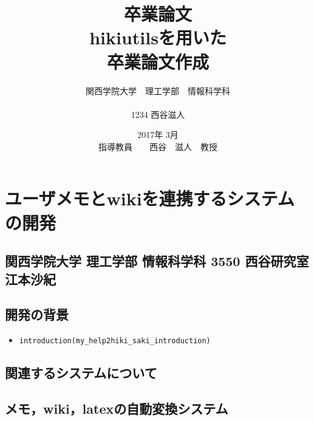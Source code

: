 \documentclass[12pt,a4paper]{jsarticle}
\begin{document}
\title{卒業論文\\
\vspace{4cm} hikiutilsを用いた\\卒業論文作成}
\author{ 関西学院大学　理工学部　情報科学科\\\\1234 西谷滋人}
\date{\vspace{3cm} 2017年  3月\\
\vspace{3cm} 指導教員　　西谷　滋人　教授}
\maketitle
\setcounter{tocdepth}{6}
\tableofcontents

\tableofcontents
\section{ユーザメモとwikiを連携するシステムの開発}
\subsection{関西学院大学 理工学部 情報科学科 3550 西谷研究室 江本沙紀}
\subsection{開発の背景}
\begin{itemize}
\item \verb|introduction(my_help2hiki_saki_introduction)|
\end{itemize}
\subsection{関連するシステムについて}




\subsection{メモ，wiki，latexの自動変換システム}



\end{document}
